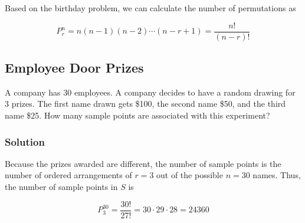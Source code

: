 \documentclass[11pt]{article}
\theoremstyle{definition}
\begin{document}
Based on the birthday problem, we can calculate the number of permutations as

$$
	P^n_r = n(n-1)(n-2)\cdots(n-r+1) = \frac{n!}{(n-r)!}
$$

\subsection{Employee Door Prizes}

A company has 30 employees. A company decides to have a random drawing for 3 prizes. The first name drawn gets \$100, the second name \$50, and the third name \$25. How many sample points are associated with this experiment?

\subsubsection*{Solution}

Because the prizes awarded are different, the number of sample points is the number of ordered arrangements of $r=3$ out of the possible $n=30$ names. Thus, the number of sample points in $S$ is

$$
	P^{30}_3 = \frac{30!}{27!} = 30 \cdot 29 \cdot 28 = 24360
$$
\end{document}
